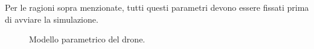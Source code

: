 Per le ragioni sopra menzionate, tutti questi parametri devono essere fissati prima di avviare la simulazione.

\begin{figure}[H] 
    \captionsetup{justification=centering, margin=2cm, font=footnotesize}
    \begin{center}
    \end{center}
    \caption[short]{Modello parametrico del drone.}
    \label{modello_drone}
\end{figure}

